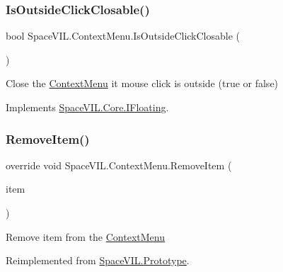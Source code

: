 \subsubsection{\texorpdfstring{Is\+Outside\+Click\+Closable()}{IsOutsideClickClosable()}}
{\footnotesize\ttfamily bool Space\+V\+I\+L.\+Context\+Menu.\+Is\+Outside\+Click\+Closable (\begin{DoxyParamCaption}{ }\end{DoxyParamCaption})}



Close the \mbox{\hyperlink{class_space_v_i_l_1_1_context_menu}{Context\+Menu}} it mouse click is outside (true or false) 



Implements \mbox{\hyperlink{interface_space_v_i_l_1_1_core_1_1_i_floating}{Space\+V\+I\+L.\+Core.\+I\+Floating}}.

\mbox{\label{class_space_v_i_l_1_1_context_menu_a35bae3cc791ba6de129af36ddb0fb63b}} 
\subsubsection{\texorpdfstring{Remove\+Item()}{RemoveItem()}}
{\footnotesize\ttfamily override void Space\+V\+I\+L.\+Context\+Menu.\+Remove\+Item (\begin{DoxyParamCaption}\item[{\mbox{\hyperlink{interface_space_v_i_l_1_1_core_1_1_i_base_item}{I\+Base\+Item}}}]{item }\end{DoxyParamCaption})\hspace{0.3cm}{\ttfamily [virtual]}}



Remove item from the \mbox{\hyperlink{class_space_v_i_l_1_1_context_menu}{Context\+Menu}} 



Reimplemented from \mbox{\hyperlink{class_space_v_i_l_1_1_prototype_a7a2aabccfe6389f71d0265fa73f0ae87}{Space\+V\+I\+L.\+Prototype}}.

\mbox{\label{class_space_v_i_l_1_1_context_menu_ae8eaad3b3f7858ab1d03f5a18d94e4ca}} 
